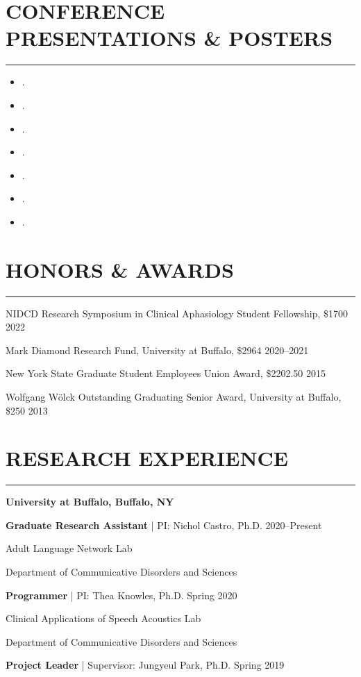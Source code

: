 \documentclass[11pt]{article}
\newcommand{\cvsection}[1]{\vspace{-0.2cm}\section*{\Large #1}\vspace{-0.2cm}\hrule\vspace{0.2cm}}
\newcommand{\h}[1]{\hspace{15pt} #1}
\begin{document}
\cvsection{CONFERENCE PRESENTATIONS \& POSTERS}

\begin{itemize}[leftmargin=!,labelindent=!,itemindent=-18pt]
    \setlength\itemsep{0.3em}

    \item[] .
    \item[] .
    \item[] .
    \item[] .
    \item[] .
    \item[] .
    \item[] .

\end{itemize}



\cvsection{HONORS \& AWARDS}

NIDCD Research Symposium in Clinical Aphasiology Student Fellowship, \$1700 \hfill 2022

Mark Diamond Research Fund, University at Buffalo, \$2964 \hfill 2020--2021

New York State Graduate Student Employees Union Award, \$2202.50 \hfill 2015

Wolfgang W{\"o}lck Outstanding Graduating Senior Award, University at Buffalo, \$250 \hfill 2013



\cvsection{RESEARCH EXPERIENCE}

\textbf{\large University at Buffalo, Buffalo, NY}

\textbf{Graduate Research Assistant} | PI: Nichol Castro, Ph.D. \hfill 2020--Present

\h{Adult Language Network Lab}

\h{Department of Communicative Disorders and Sciences}

\textbf{Programmer} | PI: Thea Knowles, Ph.D. \hfill Spring 2020

\h{Clinical Applications of Speech Acoustics Lab}

\h{Department of Communicative Disorders and Sciences}

\textbf{Project Leader} | Supervisor: Jungyeul Park, Ph.D. \hfill Spring 2019
\end{document}
